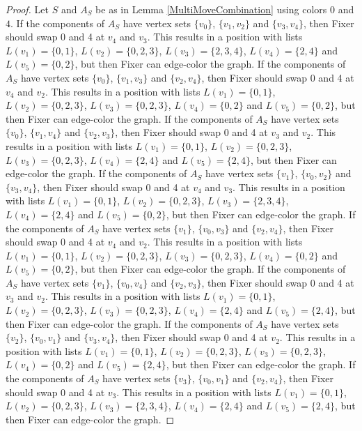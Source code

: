 \documentclass[12pt]{amsart}
\theoremstyle{plain}
\theoremstyle{definition}
\theoremstyle{remark}
\begin{document}
\begin{proof}
Let $S$ and $A_S$ be as in Lemma \ref{MultiMoveCombination} using colors $0$ and $4$. If the components of $A_S$ have vertex sets $\{v_0\}$, $\{v_1, v_2\}$ and $\{v_3, v_4\}$, then Fixer should swap 0 and 4 at $v_4$ and $v_3$. This results in a position with lists $L(v_1) = \{0, 1\}$, $L(v_2) = \{0, 2, 3\}$, $L(v_3) = \{2, 3, 4\}$, $L(v_4) = \{2, 4\}$ and $L(v_5) = \{0, 2\}$, but then Fixer can edge-color the graph.
If the components of $A_S$ have vertex sets $\{v_0\}$, $\{v_1, v_3\}$ and $\{v_2, v_4\}$, then Fixer should swap 0 and 4 at $v_4$ and $v_2$. This results in a position with lists $L(v_1) = \{0, 1\}$, $L(v_2) = \{0, 2, 3\}$, $L(v_3) = \{0, 2, 3\}$, $L(v_4) = \{0, 2\}$ and $L(v_5) = \{0, 2\}$, but then Fixer can edge-color the graph.
If the components of $A_S$ have vertex sets $\{v_0\}$, $\{v_1, v_4\}$ and $\{v_2, v_3\}$, then Fixer should swap 0 and 4 at $v_3$ and $v_2$. This results in a position with lists $L(v_1) = \{0, 1\}$, $L(v_2) = \{0, 2, 3\}$, $L(v_3) = \{0, 2, 3\}$, $L(v_4) = \{2, 4\}$ and $L(v_5) = \{2, 4\}$, but then Fixer can edge-color the graph.
If the components of $A_S$ have vertex sets $\{v_1\}$, $\{v_0, v_2\}$ and $\{v_3, v_4\}$, then Fixer should swap 0 and 4 at $v_4$ and $v_3$. This results in a position with lists $L(v_1) = \{0, 1\}$, $L(v_2) = \{0, 2, 3\}$, $L(v_3) = \{2, 3, 4\}$, $L(v_4) = \{2, 4\}$ and $L(v_5) = \{0, 2\}$, but then Fixer can edge-color the graph.
If the components of $A_S$ have vertex sets $\{v_1\}$, $\{v_0, v_3\}$ and $\{v_2, v_4\}$, then Fixer should swap 0 and 4 at $v_4$ and $v_2$. This results in a position with lists $L(v_1) = \{0, 1\}$, $L(v_2) = \{0, 2, 3\}$, $L(v_3) = \{0, 2, 3\}$, $L(v_4) = \{0, 2\}$ and $L(v_5) = \{0, 2\}$, but then Fixer can edge-color the graph.
If the components of $A_S$ have vertex sets $\{v_1\}$, $\{v_0, v_4\}$ and $\{v_2, v_3\}$, then Fixer should swap 0 and 4 at $v_3$ and $v_2$. This results in a position with lists $L(v_1) = \{0, 1\}$, $L(v_2) = \{0, 2, 3\}$, $L(v_3) = \{0, 2, 3\}$, $L(v_4) = \{2, 4\}$ and $L(v_5) = \{2, 4\}$, but then Fixer can edge-color the graph.
If the components of $A_S$ have vertex sets $\{v_2\}$, $\{v_0, v_1\}$ and $\{v_3, v_4\}$, then Fixer should swap 0 and 4 at $v_2$. This results in a position with lists $L(v_1) = \{0, 1\}$, $L(v_2) = \{0, 2, 3\}$, $L(v_3) = \{0, 2, 3\}$, $L(v_4) = \{0, 2\}$ and $L(v_5) = \{2, 4\}$, but then Fixer can edge-color the graph.
If the components of $A_S$ have vertex sets $\{v_3\}$, $\{v_0, v_1\}$ and $\{v_2, v_4\}$, then Fixer should swap 0 and 4 at $v_3$. This results in a position with lists $L(v_1) = \{0, 1\}$, $L(v_2) = \{0, 2, 3\}$, $L(v_3) = \{2, 3, 4\}$, $L(v_4) = \{2, 4\}$ and $L(v_5) = \{2, 4\}$, but then Fixer can edge-color the graph.

\end{proof}
\end{document}
